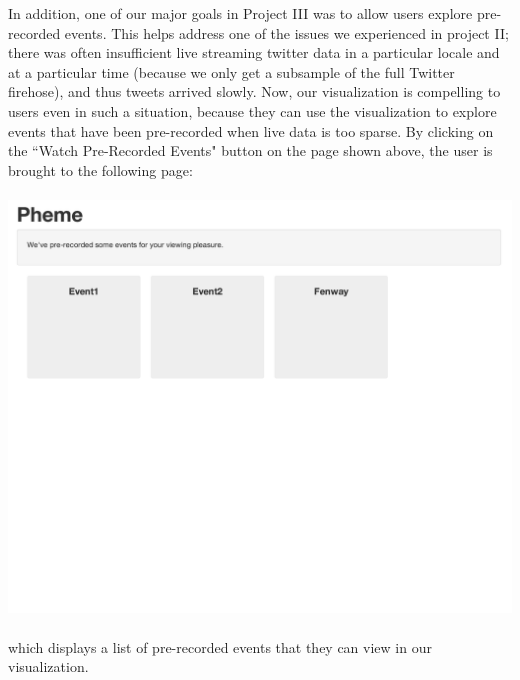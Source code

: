 \documentclass[pdftex,12pt,a4paper]{article}
\begin{document}
In addition, one of our major goals in Project III was to allow users explore pre-recorded events. This helps address one of the issues we experienced in project II; there was often insufficient live streaming twitter data in a particular locale and at a particular time (because we only get a subsample of the full Twitter firehose), and thus tweets arrived slowly. Now, our visualization is compelling to users even in such a situation, because they can use the visualization to explore events that have been pre-recorded when live data is too sparse. By clicking on the ``Watch Pre-Recorded Events" button on the page shown above, the user is brought to the following page: \\ \\
\includegraphics[width=5.5in]{splash2.png} \\ \\
which displays a list of pre-recorded events that they can view in our visualization. 
\end{document}
